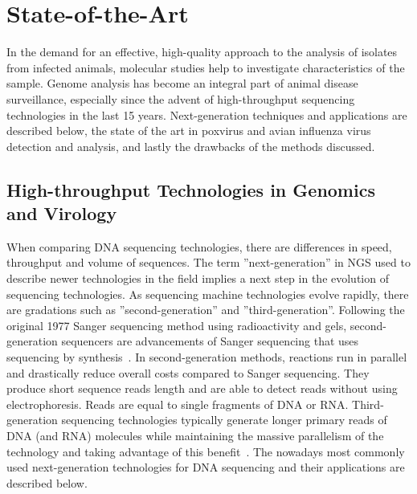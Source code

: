 \chapter{State-of-the-Art}\label{chap:state-art}
In the demand for an effective, high-quality approach to the analysis of isolates from infected animals, molecular studies help to investigate characteristics of the sample. Genome analysis has become an integral part of animal disease surveillance, especially since the advent of high-throughput sequencing technologies in the last 15 years. Next-generation techniques and applications are described below, the state of the art in poxvirus and avian influenza virus detection and analysis, and lastly the drawbacks of the methods discussed.

\section{High-throughput Technologies in Genomics and Virology}
When comparing \ac{DNA} sequencing technologies, there are differences in speed, throughput and volume of sequences. The term ''next-generation'' in \ac{NGS} used to describe newer technologies in the field implies a next step in the evolution of sequencing technologies. As sequencing machine technologies evolve rapidly, there are gradations such as ''second-generation'' and ''third-generation''. Following the original 1977 Sanger sequencing method using radioactivity and gels, second-generation sequencers are advancements of Sanger sequencing that uses sequencing by synthesis~\cite{mardis2008next}. In second-generation methods, reactions run in parallel and drastically reduce overall costs compared to Sanger sequencing. They produce short sequence reads length and are able to detect reads without using electrophoresis. Reads are equal to single fragments of \ac{DNA} or \ac{RNA}.
Third-generation sequencing technologies typically generate longer primary reads of \ac{DNA} (and \ac{RNA}) molecules while maintaining the massive parallelism of the technology and taking advantage of this benefit~\cite{slatko2018overview}. The nowadays most commonly used next-generation technologies for \ac{DNA} sequencing and their applications are described below.

